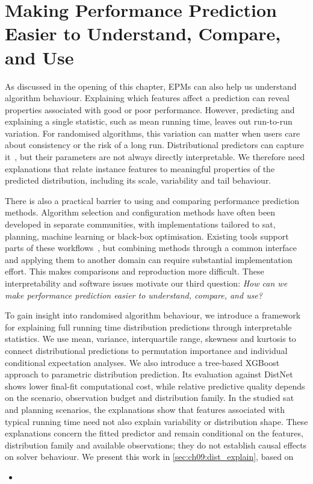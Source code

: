 \section{Making Performance Prediction Easier to Understand, Compare, and Use}

As discussed in the opening of this chapter, EPMs can also help us understand algorithm behaviour. Explaining which features affect a prediction can reveal properties associated with good or poor performance. However, predicting and explaining a single statistic, such as mean running time, leaves out run-to-run variation. For randomised algorithms, this variation can matter when users care about consistency or the risk of a long run. Distributional predictors can capture it~\citep{EggEtAl18,TueBur21}, but their parameters are not always directly interpretable. We therefore need explanations that relate instance features to meaningful properties of the predicted distribution, including its scale, variability and tail behaviour.

There is also a practical barrier to using and comparing performance prediction methods. Algorithm selection and configuration methods have often been developed in separate communities, with implementations tailored to \gls{sat}, planning, machine learning or black-box optimisation. Existing tools support parts of these workflows~\citep{Kotthoff13b,LinEtAl15,LinEtAl22b}, but combining methods through a common interface and applying them to another domain can require substantial implementation effort. This makes comparisons and reproduction more difficult. These interpretability and software issues motivate our third question: \emph{How can we make performance prediction easier to understand, compare, and use?}

To gain insight into randomised algorithm behaviour, we introduce a framework for explaining full running time distribution predictions through interpretable statistics. We use mean, variance, interquartile range, skewness and kurtosis to connect distributional predictions to permutation importance and individual conditional expectation analyses. We also introduce a tree-based XGBoost approach to parametric distribution prediction. Its evaluation against DistNet~\citep{EggEtAl18} shows lower final-fit computational cost, while relative predictive quality depends on the scenario, observation budget and distribution family. In the studied \gls{sat} and planning scenarios, the explanations show that features associated with typical running time need not also explain variability or distribution shape. These explanations concern the fitted predictor and remain conditional on the features, distribution family and available observations; they do not establish causal effects on solver behaviour. We present this work in \cref{sec:ch09:dist_explain}, based on
\begin{itemize}
    \item {}
\end{itemize}

